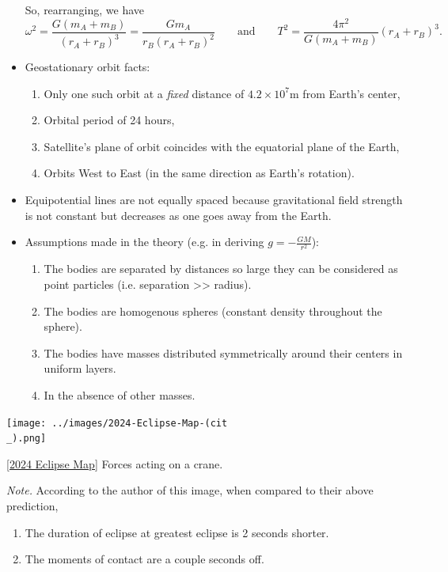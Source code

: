 \documentclass[oneside]{book}
\begin{document}
\begin{itemize}[label=\(\square\)]
So, rearranging, we have
\[\omega^2=\frac{G(m_A+m_B)}{(r_A+r_B)^3}=\frac{Gm_A}{r_B(r_A+r_B)^2} \qquad\text{and}\qquad T^2=\frac{4\pi^2}{G(m_A+m_B)}(r_A+r_B)^3.\]
\item Geostationary orbit facts:
\begin{enumerate}
    \item Only one such orbit at a \emph{fixed} distance of \(4.2\times10^7\text{m}\) from Earth's center,
    \item Orbital period of 24 hours,
    \item Satellite's plane of orbit coincides with the equatorial plane of the Earth,
    \item Orbits West to East (in the same direction as Earth's rotation). 
\end{enumerate}
\item Equipotential lines are not equally spaced because gravitational field strength is not constant but decreases as one goes away from the Earth.
\item Assumptions made in the theory (e.g. in deriving \(g=-\frac{GM}{r^2}\)):
\begin{enumerate}
    \item The bodies are separated by distances so large they can be considered as point particles (i.e. separation >> radius).
    \item The bodies are homogenous spheres (constant density throughout the sphere).
    \item The bodies have masses distributed symmetrically around their centers in uniform layers.
    \item In the absence of other masses.
\end{enumerate}
\end{itemize}
\begin{center}
    \texttt{[image: ../images/2024-Eclipse-Map-(cit\\\_).png]}
    \captionsetup{type=figure}
    \caption[figure]{\ref{2024 Eclipse Map} Forces acting on a crane.}
\end{center}
\emph{Note.} According to the author of this image, when compared to their above prediction,
\begin{enumerate}
    \item The duration of eclipse at greatest eclipse is 2 seconds shorter.
    \item The moments of contact are a couple seconds off.
\end{enumerate}
\end{document}
